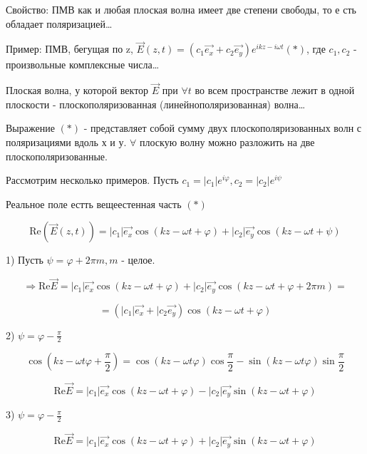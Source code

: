 \documentclass[12pt, a4paper]{report}
\begin{document}
\fi


Свойство: ПМВ как и любая плоская волна имеет две степени свободы, то е сть обладает поляризацией\dots

Пример: ПМВ, бегущая по z, \( \vec{E}( z,t)= ( c_1 \vec{e_x}+ c_2 \vec{e_y} )e^{ikz- i \omega t}  (*) \), где \( c_1, c_2 \) - произвольные комплексные числа\dots

\begin{definition}
    Плоская волна, у которой вектор \( \vec{E} \) при \( \forall t \) во всем пространстве лежит в одной плоскости - плоскополяризованная (линейнополяризованная) волна\dots
\end{definition}

Выражение \( (*) \) - представляет собой сумму двух плоскополяризованных волн с поляризациями вдоль х и у. \( \forall  \)  плоскую волну можно разложить на две плоскополяризованные.

Рассмотрим несколько примеров. Пусть \( c_1= |c_1|e^{i \varphi} , c_2= |c_2|e^{ i \psi }  \) 

Реальное поле естть вещеестенная часть \( (*) \) 

\[ \mathrm{Re} ( \vec{E}(z,t))= |c_1|\vec{e_x}\cos (kz - \omega t + \varphi) + |c_2|\vec{e_y}\cos (kz - \omega t + \psi)   \] 

1) Пусть \( \psi = \varphi + 2 \pi m, m  \) - целое. 

\[ \Rightarrow \mathrm{Re}\vec{E }= |c_1|\vec{e_x}\cos (kz - \omega t + \varphi) + |c_2|\vec{e_y}\cos (kz - \omega t + \varphi + 2 \pi m)=   \]

\[= (|c_1| \vec{e_x} + |c_2\vec{e_y}) \cos (kz - \omega t + \varphi )  \] 


2) \(\displaystyle  \psi = \varphi - \frac{\pi}{2}    \) 

\[ \cos  ( kz - \omega t \varphi+ \frac{\pi}{2} )= \cos( kz - \omega t \varphi)\cos \frac{\pi}{2}-\sin( kz - \omega t \varphi)\sin  \frac{\pi}{2}   \] 

\[ \mathrm{Re}\vec{E }= |c_1|\vec{e_x}\cos ( kz - \omega t + \varphi)  - |c_2|\vec{e_y}\sin( kz - \omega t + \varphi)   \] 


3) \( \psi=\varphi - \frac{\pi}{2}  \) 

\[ \mathrm{Re}\vec{E }= |c_1|\vec{e_x}\cos ( kz - \omega t + \varphi)  + |c_2|\vec{e_y}\sin( kz - \omega t + \varphi)   \] 
\end{document}
